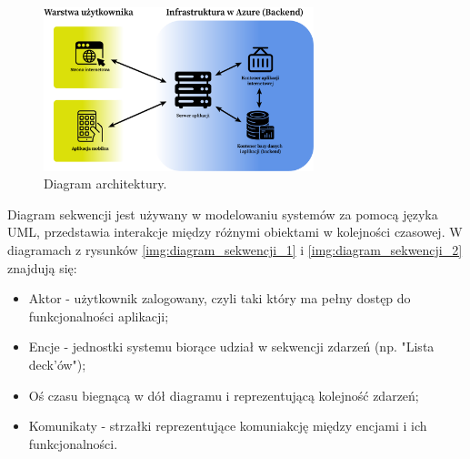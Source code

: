 \begin{figure}[H]
    \centering
    \includegraphics[width=0.7\textwidth]{chapters/chapter_6/diagram_architektury}
    \caption{Diagram architektury.}
    \label{img:diagram_architektury}
\end{figure}


\setlength{\parindent}{15pt}
\indent Diagram sekwencji jest używany w modelowaniu systemów za pomocą języka UML, przedstawia interakcje między różnymi obiektami w kolejności czasowej. W diagramach z rysunków \ref{img:diagram_sekwencji_1} i \ref{img:diagram_sekwencji_2} znajdują się:
\begin{itemize}
    \item Aktor - użytkownik zalogowany, czyli taki który ma pełny dostęp do funkcjonalności aplikacji;
    \item Encje - jednostki systemu biorące udział w sekwencji zdarzeń (np. "Lista deck'ów");
    \item Oś czasu biegnącą w dół diagramu i reprezentującą kolejność zdarzeń;
    \item Komunikaty - strzałki reprezentujące komuniakcję między encjami i ich funkcjonalności.
\end{itemize}


